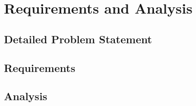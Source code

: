 \chapter{Requirements and Analysis}

\section{Detailed Problem Statement}

\section{Requirements}

\section{Analysis}
